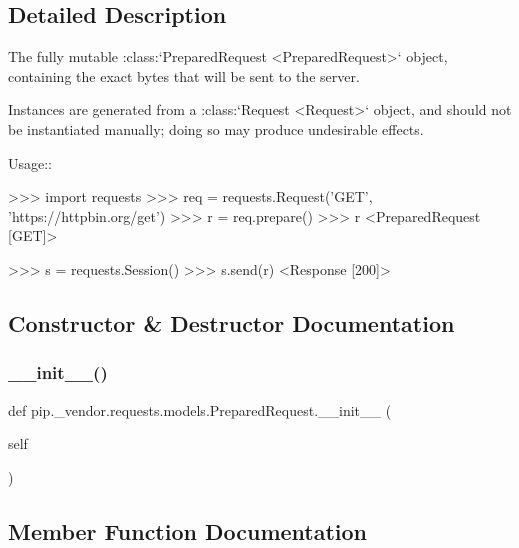 \subsection{Detailed Description}
\begin{DoxyVerb}The fully mutable :class:`PreparedRequest <PreparedRequest>` object,
containing the exact bytes that will be sent to the server.

Instances are generated from a :class:`Request <Request>` object, and
should not be instantiated manually; doing so may produce undesirable
effects.

Usage::

  >>> import requests
  >>> req = requests.Request('GET', 'https://httpbin.org/get')
  >>> r = req.prepare()
  >>> r
  <PreparedRequest [GET]>

  >>> s = requests.Session()
  >>> s.send(r)
  <Response [200]>
\end{DoxyVerb}
 

\subsection{Constructor \& Destructor Documentation}
\mbox{\label{classpip_1_1__vendor_1_1requests_1_1models_1_1PreparedRequest_aded2c1456d9f4ff61fc212e0d930e92f}} 
\subsubsection{\texorpdfstring{\+\_\+\+\_\+init\+\_\+\+\_\+()}{\_\_init\_\_()}}
{\footnotesize\ttfamily def pip.\+\_\+vendor.\+requests.\+models.\+Prepared\+Request.\+\_\+\+\_\+init\+\_\+\+\_\+ (\begin{DoxyParamCaption}\item[{}]{self }\end{DoxyParamCaption})}



\subsection{Member Function Documentation}
\mbox{\label{classpip_1_1__vendor_1_1requests_1_1models_1_1PreparedRequest_aaffb2d77942451dc425721a88a0c3435}} 
